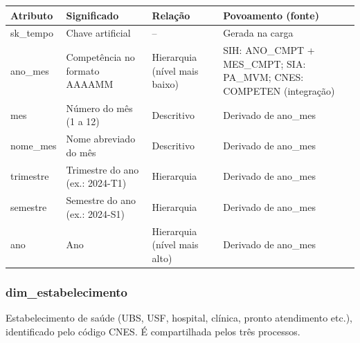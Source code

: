 \documentclass[12pt,a4paper]{article}
\begin{document}
{\small{}\begin{longtable}{|>{\raggedright\arraybackslash}p{}|>{\raggedright\arraybackslash}p{}|>{\raggedright\arraybackslash}p{}|>{\raggedright\arraybackslash}p{}|}\hline\rowcolor{azul}\color{white}\bfseries Atributo & \color{white}\bfseries Significado & \color{white}\bfseries Relação & \color{white}\bfseries Povoamento (fonte) \\ \hline\endhead
sk\_\allowbreak{}tempo & Chave artificial & – & Gerada na carga \\ \hline
ano\_\allowbreak{}mes & Competência no formato AAAAMM & Hierarquia (nível mais baixo) & SIH: ANO\_\allowbreak{}CMPT + MES\_\allowbreak{}CMPT; SIA: PA\_\allowbreak{}MVM; CNES: COMPETEN (integração) \\ \hline
mes & Número do mês (1 a 12) & Descritivo & Derivado de ano\_\allowbreak{}mes \\ \hline
nome\_\allowbreak{}mes & Nome abreviado do mês & Descritivo & Derivado de ano\_\allowbreak{}mes \\ \hline
trimestre & Trimestre do ano (ex.: 2024-T1) & Hierarquia & Derivado de ano\_\allowbreak{}mes \\ \hline
semestre & Semestre do ano (ex.: 2024-S1) & Hierarquia & Derivado de ano\_\allowbreak{}mes \\ \hline
ano & Ano & Hierarquia (nível mais alto) & Derivado de ano\_\allowbreak{}mes \\ \hline\end{longtable}}

\subsubsection*{dim\_\allowbreak{}estabelecimento}

Estabelecimento de saúde (UBS, USF, hospital, clínica, pronto atendimento etc.), identificado pelo código CNES. É compartilhada pelos três processos.
\end{document}
